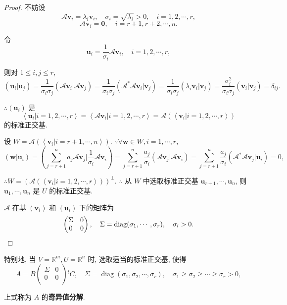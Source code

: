 \documentclass{ctexart}
\begin{document}
\begin{proof}
    不妨设
    \[\mathcal{A}\boldsymbol{v}_i=\lambda_i\boldsymbol{v}_i,\quad\sigma_i=\sqrt{\lambda_i}>0,\quad i=1,2,\cdots,r,\]
    \[\mathcal{A}\boldsymbol{v}_i=\boldsymbol{0},\quad i=r+1,r+2,\cdots,n.\]

    令
    \[\boldsymbol{u}_i=\dfrac{1}{\sigma_i}\mathcal{A}\boldsymbol{v}_i,\quad i=1,2,\cdots,r,\]

    则对 $1\leq i,j\leq r$,
    \[(\boldsymbol{u}_i|\boldsymbol{u}_j)=\dfrac{1}{\sigma_i\sigma_j}(\mathcal{A}\boldsymbol{v}_i|\mathcal{A}\boldsymbol{v}_j)=\dfrac{1}{\sigma_i\sigma_j}(\mathcal{A}^*\mathcal{A}\boldsymbol{v}_i|\boldsymbol{v}_j)=\dfrac{1}{\sigma_i\sigma_j}(\lambda_i\boldsymbol{v}_i|\boldsymbol{v}_j)=\dfrac{\sigma_i^2}{\sigma_i\sigma_j}(\boldsymbol{v}_i|\boldsymbol{v}_j)=\delta_{ij}.\]

    $\therefore(\boldsymbol{u}_i)$ 是
    \[\left<\boldsymbol{u}_i|i=1,2,\cdots,r\right>=\left<\mathcal{A}\boldsymbol{v}_i|i=1,2,\cdots,r\right>=\mathcal{A}(\left<\boldsymbol{v}_i|i=1,2,\cdots,r\right>)\]
    的标准正交基.

    设 $W=\mathcal{A}(\left<\boldsymbol{v}_i|i=r+1,\cdots,n\right>)$. $\because\forall\boldsymbol{w}\in W,i=1,\cdots,r$,
    \[(\boldsymbol{w}|\boldsymbol{u}_i)=\left(\sum\limits_{j=r+1}^na_j\mathcal{A}\boldsymbol{v}_j\Bigg|\dfrac{1}{\sigma_i}\mathcal{A}\boldsymbol{v}_i\right)=\sum\limits_{j=r+1}^n\dfrac{a_j}{\sigma_i}(\mathcal{A}\boldsymbol{v}_j|\mathcal{A}\boldsymbol{v}_i)=\sum\limits_{j=r+1}^n\dfrac{a_j}{\sigma_i}(\mathcal{A}^*\mathcal{A}\boldsymbol{v}_j|\boldsymbol{u}_i)=0,\]

    $\therefore W=(\mathcal{A}(\left<\boldsymbol{v}_i|i=1,2,\cdots,r\right>))^\perp$. $\therefore$ 从 $W$ 中选取标准正交基 $\boldsymbol{u}_{r+1},\cdots,\boldsymbol{u}_n$, 则 $\boldsymbol{u}_1,\cdots,\boldsymbol{u}_n$ 是 $U$ 的标准正交基.

    $\mathcal{A}$ 在基 $(\boldsymbol{v}_i)$ 和 $(\boldsymbol{u}_i)$ 下的矩阵为
    \[\begin{pmatrix}
        \Sigma & 0 \\
        0 & 0 \\
    \end{pmatrix},\quad\Sigma=\operatorname{diag}(\sigma_1,\cdots,\sigma_r),\quad\sigma_i>0.\qedhere\]
\end{proof}
\begin{note}
    特别地, 当 $V=\mathbb{R}^m,U=\mathbb{R}^n$ 时, 选取适当的标准正交基, 使得
    \[A=B\begin{pmatrix}
        \Sigma & 0 \\
        0 & 0 \\
    \end{pmatrix}{}^tC,\quad\Sigma=\operatorname{diag}(\sigma_1,\sigma_2,\cdots,\sigma_r),\quad \sigma_1\geq\sigma_2\geq\cdots\geq\sigma_r>0,\]

    上式称为 $A$ 的\textbf{奇异值分解}.
\end{note}
\end{document}
